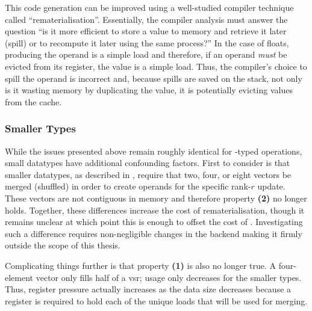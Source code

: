 \documentclass[\main/thesis.tex]{subfiles}
\begin{document}
This code generation can be improved using a well-studied compiler technique called ``\gls{rematerialisation}''.
Essentially, the compiler analysis must answer the question ``is it more efficient to store a value to memory and retrieve it later (\gls{spill}) or to recompute it later using the same process?''
In the case of floats, producing the operand is a simple load and therefore, if an operand \emph{must} be evicted from its register,  the value is a simple load.
Thus, the compiler's choice to spill the operand is incorrect and, because spills are saved on the stack, not only is it wasting memory by duplicating the value, it is potentially evicting values from the cache.

\subsubsection{Smaller Types}
While the issues presented above remain roughly identical for -typed operations, small datatypes have  additional confounding factors.
First to consider is that smaller datatypes, as described in , require that two, four, or eight vectors be merged (shuffled) in order to create operands for the specific rank-$r$ update.
These vectors are not contiguous in memory and therefore property \textbf{(2)} no longer holds.
Together, these differences increase the cost of \gls{rematerialisation}, though it remains unclear at which point this is enough to offset the cost of .
Investigating such a difference requires non-negligible changes in the backend making it firmly outside the scope of this thesis.

Complicating things further is that property \textbf{(1)} is also no longer true.
A four-element  vector only fills half of a \gls{vsr}; usage only decreases for the smaller types.
Thus, register pressure actually increases as the data size decreases because a register is required to hold each of the unique loads that will be used for merging.
\end{document}
